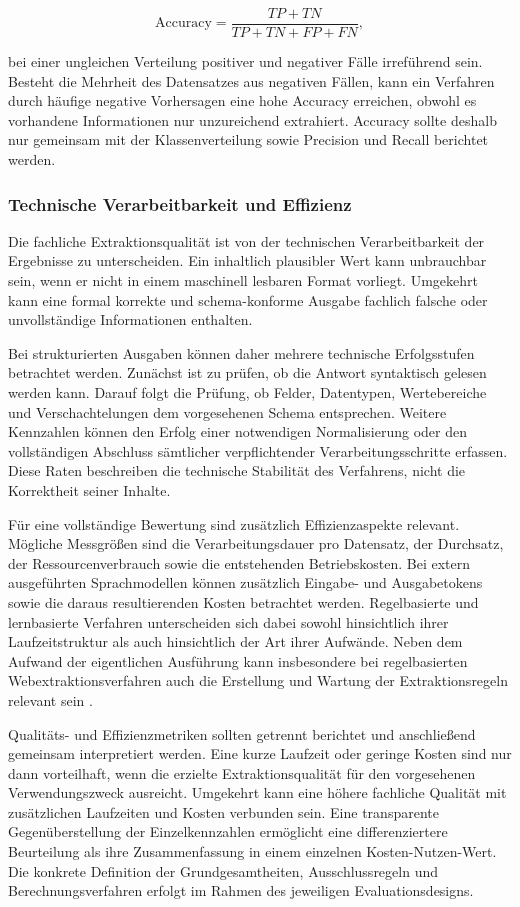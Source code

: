 \[
\mathrm{Accuracy} = \frac{TP + TN}{TP + TN + FP + FN},
\]

bei einer ungleichen Verteilung positiver und negativer Fälle irreführend sein. Besteht die Mehrheit des Datensatzes aus negativen Fällen, kann ein Verfahren durch 
häufige negative Vorhersagen eine hohe Accuracy erreichen, obwohl es vorhandene Informationen nur unzureichend extrahiert. Accuracy sollte deshalb nur gemeinsam mit 
der Klassenverteilung sowie Precision und Recall berichtet werden.

\subsubsection{Technische Verarbeitbarkeit und Effizienz}

Die fachliche Extraktionsqualität ist von der technischen Verarbeitbarkeit der Ergebnisse zu unterscheiden. Ein inhaltlich plausibler Wert kann unbrauchbar sein, wenn 
er nicht in einem maschinell lesbaren Format vorliegt. Umgekehrt kann eine formal korrekte und schema-konforme Ausgabe fachlich falsche oder unvollständige Informationen 
enthalten.

Bei strukturierten Ausgaben können daher mehrere technische Erfolgsstufen betrachtet werden. Zunächst ist zu prüfen, ob die Antwort syntaktisch gelesen werden kann. 
Darauf folgt die Prüfung, ob Felder, Datentypen, Wertebereiche und Verschachtelungen dem vorgesehenen Schema entsprechen. Weitere Kennzahlen können den Erfolg einer 
notwendigen Normalisierung oder den vollständigen Abschluss sämtlicher verpflichtender Verarbeitungsschritte erfassen. Diese Raten beschreiben die technische Stabilität 
des Verfahrens, nicht die Korrektheit seiner Inhalte.

Für eine vollständige Bewertung sind zusätzlich Effizienzaspekte relevant. Mögliche Messgrößen sind die Verarbeitungsdauer pro Datensatz, der Durchsatz, der 
Ressourcenverbrauch sowie die entstehenden Betriebskosten. Bei extern ausgeführten Sprachmodellen können zusätzlich Eingabe- und Ausgabetokens sowie die daraus 
resultierenden Kosten betrachtet werden. Regelbasierte und lernbasierte Verfahren unterscheiden sich dabei sowohl hinsichtlich ihrer Laufzeitstruktur als auch hinsichtlich 
der Art ihrer Aufwände. Neben dem Aufwand der eigentlichen Ausführung kann insbesondere bei regelbasierten Webextraktionsverfahren auch die Erstellung und Wartung 
der Extraktionsregeln relevant sein \cite{ferrara2014web}.

Qualitäts- und Effizienzmetriken sollten getrennt berichtet und anschließend gemeinsam interpretiert werden. Eine kurze Laufzeit oder geringe Kosten sind nur dann 
vorteilhaft, wenn die erzielte Extraktionsqualität für den vorgesehenen Verwendungszweck ausreicht. Umgekehrt kann eine höhere fachliche Qualität mit zusätzlichen 
Laufzeiten und Kosten verbunden sein. Eine transparente Gegenüberstellung der Einzelkennzahlen ermöglicht eine differenziertere Beurteilung als ihre Zusammenfassung 
in einem einzelnen Kosten-Nutzen-Wert. Die konkrete Definition der Grundgesamtheiten, Ausschlussregeln und Berechnungsverfahren erfolgt im Rahmen des jeweiligen 
Evaluationsdesigns.

